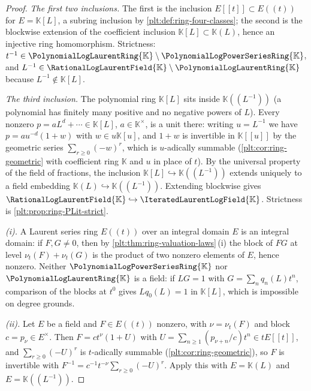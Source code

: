 \documentclass[11pt,oneside]{article}
\theoremstyle{plain}
\theoremstyle{definition}
\theoremstyle{remark}
\newcommand{\K}{\mathbb{K}}
\newcommand{\PLpow}{\PolynomialLogPowerSeriesRing{\K}}   %
\newcommand{\PLlau}{\PolynomialLogLaurentRing{\K}}       %
\newcommand{\PLrat}{\RationalLogLaurentField{\K}}        %
\newcommand{\PLit}{\IteratedLaurentLogField{\K}}         %
\newcommand{\ordt}{\nu_{t}}                              %
\begin{document}
\begin{proof}
\emph{The first two inclusions.}  The first is the inclusion
\(E[[t]]\subset E((t))\) for \(E=\K[L]\), a subring inclusion by
\cref{plt:def:ring-four-classes}; the second is the blockwise extension of the
coefficient inclusion \(\K[L]\subset\K(L)\), hence an injective ring
homomorphism.  Strictness: \(t^{-1}\in\PLlau\setminus\PLpow\), and
\(L^{-1}\in\PLrat\setminus\PLlau\) because \(L^{-1}\notin\K[L]\).

\emph{The third inclusion.}  The polynomial ring \(\K[L]\) sits inside
\(\K((L^{-1}))\) (a polynomial has finitely many positive and no negative
powers of \(L\)).  Every nonzero \(p=aL^d+\cdots\in\K[L]\), \(a\in\K^\times\),
is a unit there: writing \(u=L^{-1}\) we have \(p=au^{-d}(1+w)\) with
\(w\in u\K[u]\), and \(1+w\) is invertible in \(\K[[u]]\) by the geometric
series \(\sum_{r\ge0}(-w)^r\), which is \(u\)-adically summable
(\cref{plt:cor:ring-geometric} with coefficient ring \(\K\) and \(u\) in place
of \(t\)).  By the
universal property of the field of fractions, the inclusion
\(\K[L]\hookrightarrow\K((L^{-1}))\) extends uniquely to a field embedding
\(\K(L)\hookrightarrow\K((L^{-1}))\).  Extending blockwise gives
\(\PLrat\hookrightarrow\PLit\).  Strictness is
\cref{plt:prop:ring-PLit-strict}.

\emph{(i).}  A Laurent series ring \(E((t))\) over an integral domain \(E\) is
an integral domain: if \(F,G\ne0\), then by
\cref{plt:thm:ring-valuation-laws}\,(i) the block of \(FG\) at level
\(\ordt(F)+\ordt(G)\) is the product of two nonzero elements of \(E\), hence
nonzero.  Neither \(\PLpow\) nor \(\PLlau\) is a field: if \(LG=1\) with
\(G=\sum_nq_n(L)t^n\), comparison of the blocks at \(t^0\) gives
\(Lq_0(L)=1\) in \(\K[L]\), which is impossible on degree grounds.

\emph{(ii).}  Let \(E\) be a field and \(F\in E((t))\) nonzero, with
\(\nu=\ordt(F)\) and block \(c=p_\nu\in E^\times\).  Then
\(F=ct^\nu(1+U)\) with \(U=\sum_{n\ge1}(p_{\nu+n}/c)t^n\in tE[[t]]\), and
\(\sum_{r\ge0}(-U)^r\) is \(t\)-adically summable
(\cref{plt:cor:ring-geometric}), so \(F\) is invertible with
\(F^{-1}=c^{-1}t^{-\nu}\sum_{r\ge0}(-U)^r\).  Apply this with
\(E=\K(L)\) and \(E=\K((L^{-1}))\).
\end{proof}
\end{document}
